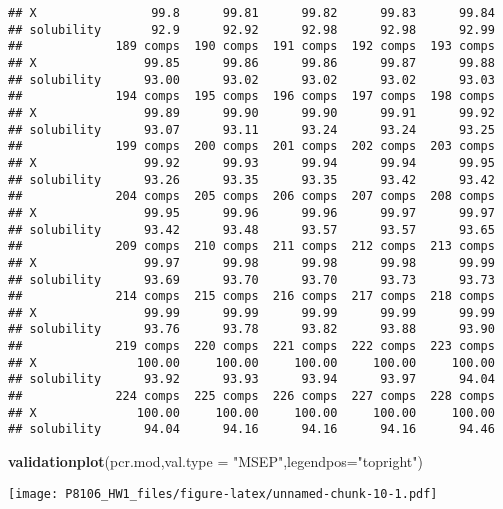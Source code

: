 \documentclass[]{article}
\newenvironment{Shaded}{\begin{snugshade}}{\end{snugshade}}
\newcommand{\DataTypeTok}[1]{\textcolor[rgb]{0.13,0.29,0.53}{#1}}
\newcommand{\DecValTok}[1]{\textcolor[rgb]{0.00,0.00,0.81}{#1}}
\newcommand{\KeywordTok}[1]{\textcolor[rgb]{0.13,0.29,0.53}{\textbf{#1}}}
\newcommand{\NormalTok}[1]{#1}
\newcommand{\OperatorTok}[1]{\textcolor[rgb]{0.81,0.36,0.00}{\textbf{#1}}}
\newcommand{\StringTok}[1]{\textcolor[rgb]{0.31,0.60,0.02}{#1}}
\begin{document}
\begin{verbatim}
## X                99.8      99.81      99.82      99.83      99.84
## solubility       92.9      92.92      92.98      92.98      92.99
##             189 comps  190 comps  191 comps  192 comps  193 comps
## X               99.85      99.86      99.86      99.87      99.88
## solubility      93.00      93.02      93.02      93.02      93.03
##             194 comps  195 comps  196 comps  197 comps  198 comps
## X               99.89      99.90      99.90      99.91      99.92
## solubility      93.07      93.11      93.24      93.24      93.25
##             199 comps  200 comps  201 comps  202 comps  203 comps
## X               99.92      99.93      99.94      99.94      99.95
## solubility      93.26      93.35      93.35      93.42      93.42
##             204 comps  205 comps  206 comps  207 comps  208 comps
## X               99.95      99.96      99.96      99.97      99.97
## solubility      93.42      93.48      93.57      93.57      93.65
##             209 comps  210 comps  211 comps  212 comps  213 comps
## X               99.97      99.98      99.98      99.98      99.99
## solubility      93.69      93.70      93.70      93.73      93.73
##             214 comps  215 comps  216 comps  217 comps  218 comps
## X               99.99      99.99      99.99      99.99      99.99
## solubility      93.76      93.78      93.82      93.88      93.90
##             219 comps  220 comps  221 comps  222 comps  223 comps
## X              100.00     100.00     100.00     100.00     100.00
## solubility      93.92      93.93      93.94      93.97      94.04
##             224 comps  225 comps  226 comps  227 comps  228 comps
## X              100.00     100.00     100.00     100.00     100.00
## solubility      94.04      94.16      94.16      94.16      94.46
\end{verbatim}

\begin{Shaded}
\begin{Highlighting}[]
\KeywordTok{validationplot}\NormalTok{(pcr.mod,}\DataTypeTok{val.type =} \StringTok{"MSEP"}\NormalTok{,}\DataTypeTok{legendpos=}\StringTok{"topright"}\NormalTok{)}
\end{Highlighting}
\end{Shaded}

\texttt{[image: P8106\_HW1\_files/figure-latex/unnamed-chunk-10-1.pdf]}

\begin{Shaded}
\end{Shaded}
\end{document}
